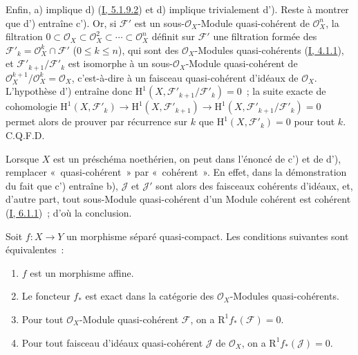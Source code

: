 Enfin, a) implique d) (\hyperref[I.5.1.9.2-fr]{I, 5.1.9.2}) et d) implique
trivialement d'). Reste à montrer que d') entraîne c'). Or, si
$\mathcal{F}'$ est un sous-$\mathcal{O}_X$-Module quasi-cohérent de
$\mathcal{O}_X^n$, la filtration
$0\subset\mathcal{O}_X\subset\mathcal{O}_X^2\subset\cdots\subset
\mathcal{O}_X^n$ définit sur $\mathcal{F}'$ une filtration formée des
$\mathcal{F}'_k=\mathcal{O}_X^k\cap\mathcal{F}'$ ($0\leq k\leq n$), qui
sont des $\mathcal{O}_X$-Modules quasi-cohérents
(\hyperref[I.4.1.1-fr]{I, 4.1.1}), et
$\mathcal{F}'_{k+1}/\mathcal{F}'_k$ est isomorphe à un
sous-$\mathcal{O}_X$-Module quasi-cohérent de
$\mathcal{O}_X^{k+1}/\mathcal{O}_X^k=\mathcal{O}_X$, c'est-à-dire à un
faisceau quasi-cohérent d'idéaux de $\mathcal{O}_X$. L'hypothèse d')
entraîne donc
$\mathrm{H}^1(X,\mathcal{F}'_{k+1}/\mathcal{F}'_k)=0$~; la suite exacte de
cohomologie
$\mathrm{H}^1(X,\mathcal{F}'_k)\to\mathrm{H}^1(X,\mathcal{F}'_{k+1})
\to\mathrm{H}^1(X,\mathcal{F}'_{k+1}/\mathcal{F}'_k)=0$ permet alors de
prouver par récurrence sur $k$ que
$\mathrm{H}^1(X,\mathcal{F}'_k)=0$ pour tout $k$. C.Q.F.D.

\begin{remark}[5.2.1.1]
\label{II.5.2.1.1-fr}
Lorsque $X$ est un préschéma noethérien, on peut dans l'énoncé de c') et de
d'), remplacer «~quasi-cohérent~» par «~cohérent~». En effet, dans la
démonstration du fait que c') entraîne b), $\mathcal{J}$ et $\mathcal{J}'$
sont alors des faisceaux cohérents d'idéaux, et, d'autre part, tout
sous-Module quasi-cohérent d'un Module cohérent est cohérent
(\hyperref[I.6.1.1-fr]{I, 6.1.1})~; d'où la conclusion.
\end{remark}

\begin{corollary}[5.2.2]
\label{II.5.2.2-fr}
Soit $f:X\to Y$ un morphisme séparé quasi-compact. Les conditions suivantes
sont équivalentes~:
\begin{enumerate}
  \item[\rm{a)}] $f$ est un morphisme affine.
  \item[\rm{b)}] Le foncteur $f_*$ est exact dans la catégorie des
  $\mathcal{O}_X$-Modules quasi-cohérents.
  \item[\rm{c)}] Pour tout $\mathcal{O}_X$-Module quasi-cohérent
  $\mathcal{F}$, on a $\mathrm{R}^1f_*(\mathcal{F})=0$.
  \item[\rm{c')}] Pour tout faisceau d'idéaux quasi-cohérent $\mathcal{J}$
  de $\mathcal{O}_X$, on a $\mathrm{R}^1f_*(\mathcal{J})=0$.
\end{enumerate}
\end{corollary}

